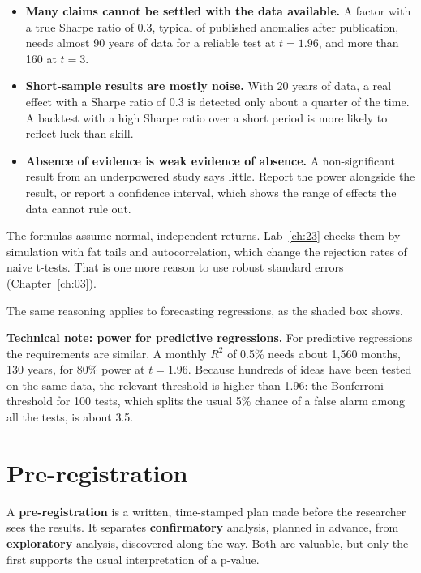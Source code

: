 \begin{itemize}
  \item \textbf{Many claims cannot be settled with the data available.} A factor with a true Sharpe ratio of 0.3, typical of published anomalies after publication, needs almost 90 years of data for a reliable test at $t = 1.96$, and more than 160 at $t = 3$.
  \item \textbf{Short-sample results are mostly noise.} With 20 years of data, a real effect with a Sharpe ratio of 0.3 is detected only about a quarter of the time. A backtest with a high Sharpe ratio over a short period is more likely to reflect luck than skill.
  \item \textbf{Absence of evidence is weak evidence of absence.} A non-significant result from an underpowered study says little. Report the power alongside the result, or report a confidence interval, which shows the range of effects the data cannot rule out.
\end{itemize}

The formulas assume normal, independent returns. Lab~\ref{ch:23} checks them by simulation with fat tails and autocorrelation, which change the rejection rates of naive t-tests. That is one more reason to use robust standard errors (Chapter~\ref{ch:03}).

The same reasoning applies to forecasting regressions, as the shaded box shows.

\begin{technote}
\textbf{Technical note: power for predictive regressions.} For predictive regressions the requirements are similar. A monthly $R^2$ of 0.5\% needs about 1,560 months, 130 years, for 80\% power at $t = 1.96$. Because hundreds of ideas have been tested on the same data, the relevant threshold is higher than 1.96: the Bonferroni threshold for 100 tests, which splits the usual 5\% chance of a false alarm among all the tests, is about 3.5.
\end{technote}

\section{Pre-registration}
\label{sec:24-prereg}

A \textbf{pre-registration} is a written, time-stamped plan made before the researcher sees the results. It separates \textbf{confirmatory} analysis, planned in advance, from \textbf{exploratory} analysis, discovered along the way. Both are valuable, but only the first supports the usual interpretation of a p-value.

